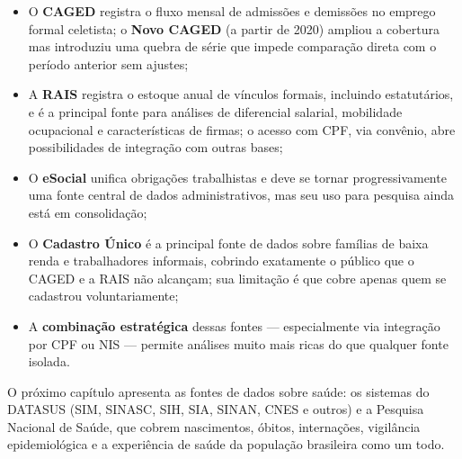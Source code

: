 \begin{itemize}
  \item O \textbf{CAGED} registra o fluxo mensal de admissões e demissões no emprego formal celetista; o \textbf{Novo CAGED} (a partir de 2020) ampliou a cobertura mas introduziu uma quebra de série que impede comparação direta com o período anterior sem ajustes;
  \item A \textbf{RAIS} registra o estoque anual de vínculos formais, incluindo estatutários, e é a principal fonte para análises de diferencial salarial, mobilidade ocupacional e características de firmas; o acesso com CPF, via convênio, abre possibilidades de integração com outras bases;
  \item O \textbf{eSocial} unifica obrigações trabalhistas e deve se tornar progressivamente uma fonte central de dados administrativos, mas seu uso para pesquisa ainda está em consolidação;
  \item O \textbf{Cadastro Único} é a principal fonte de dados sobre famílias de baixa renda e trabalhadores informais, cobrindo exatamente o público que o CAGED e a RAIS não alcançam; sua limitação é que cobre apenas quem se cadastrou voluntariamente;
  \item A \textbf{combinação estratégica} dessas fontes — especialmente via integração por CPF ou NIS — permite análises muito mais ricas do que qualquer fonte isolada.
\end{itemize}

O próximo capítulo apresenta as fontes de dados sobre saúde: os sistemas do DATASUS (SIM, SINASC, SIH, SIA, SINAN, CNES e outros) e a Pesquisa Nacional de Saúde, que cobrem nascimentos, óbitos, internações, vigilância epidemiológica e a experiência de saúde da população brasileira como um todo.